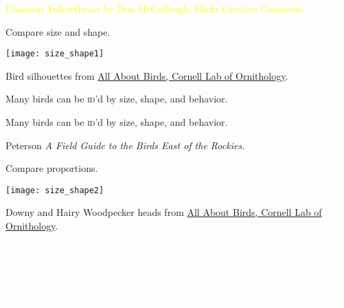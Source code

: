 \documentclass[t]{beamer}
\begin{document}
{
\begin{frame}[b,plain]
	\tiny\textcolor{yellow}{Common Yellowthroat by Don McCullough, Flickr Creative Commons.}
\end{frame}
}

\begin{frame}[b,plain]{Compare size and shape.}
	\begin{center}
		\texttt{[image: size\_shape1]}
	\end{center}
	\tiny Bird silhouettes from \href{http://allaboutbirds.com}{All About Birds, Cornell Lab of Ornithology}.
\end{frame}


{
\begin{frame}[t,plain]{Many birds can be \textsc{id}'d by size, shape, and behavior.}

	\vfilll
	
	\tiny\hfill{}
\end{frame}
}

{
\begin{frame}[t,plain]{Many birds can be \textsc{id}'d by size, shape, and behavior.}

	\vfilll
	
	\tiny\hfill{Peterson \textit{A Field Guide to the Birds East of the Rockies.}}
\end{frame}
}

\begin{frame}[b,plain]{Compare proportions.}
	\begin{center}
		\texttt{[image: size\_shape2]}
	\end{center}
	\tiny Downy and Hairy Woodpecker heads from \href{http://allaboutbirds.com}{All About Birds, Cornell Lab of Ornithology}.
\end{frame}


{
\begin{frame}[b,plain]{\hfill\textcolor{white}{Learn color and pattern.}}
	\tiny\textcolor{white}{Prairie Warbler by Kenneth Cole Schneider, Flickr Creative Commons.}
\end{frame}
}

{
\begin{frame}[b,plain]{\hfill\textcolor{white}{Compare color and pattern.}}
	\tiny\textcolor{white}{Magnolia Warbler by Bill Majoros, Flickr Creative Commons.}
\end{frame}
}
\end{document}
